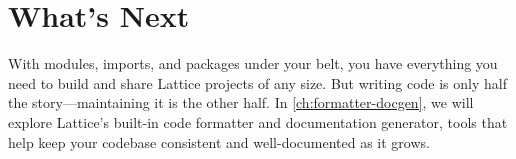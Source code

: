 \section*{What's Next}

With modules, imports, and packages under your belt, you have everything you need to build and share Lattice projects of any size.
But writing code is only half the story---maintaining it is the other half.
In \cref{ch:formatter-docgen}, we will explore Lattice's built-in code formatter and documentation generator, tools that help keep your codebase consistent and well-documented as it grows.
